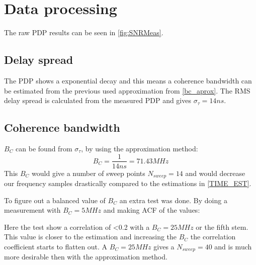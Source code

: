 \section{Data processing}
The raw PDP results can be seen in  \autoref{fig:SNRMeas}.
\subsection{Delay spread}
The PDP shows a exponential decay and this means a coherence bandwidth can be estimated from the previous used approximation from \autoref{bc_aprox}. The RMS delay spread is calculated from the measured PDP and gives $\sigma_{\tau} = 14ns$.

\subsection{Coherence bandwidth}\label{sec:coherence_bandwidth}

$B_C$ can be found from $\sigma_{\tau}$, by using the approximation method:
\begin{equation}
B_C = \frac{1}{14ns} = 71.43 MHz 
\end{equation}
This $B_C$ would give a number of sweep points $N_{sweep} = 14$ and would decrease our  frequency samples drastically compared to the estimations in \autoref{TIME_EST}.

To figure out a balanced value of $B_C$ an extra test was done. By doing a measurement with $B_C = 5MHz$ and making \gls{ACF} of the values:


Here the test show a correlation of <0.2 with a $B_C = 25MHz$ or the fifth stem. This value is closer to the estimation and increasing the $B_C$ the correlation coefficient starts to flatten out. A $B_C = 25MHz$ gives a $N_{sweep} = 40$ and is much more desirable then with the approximation method.

